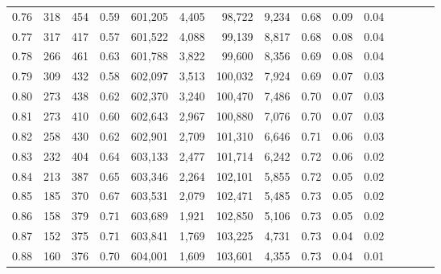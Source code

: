 \begin{tabular}{rrrcrrrrrrrrrrr}
0.76 &     318 &    454 &                                       0.59 &  601,205 &    4,405 &   98,722 &    9,234 &  0.68 &  0.09 &                         0.04 \\
0.77 &     317 &    417 &                                       0.57 &  601,522 &    4,088 &   99,139 &    8,817 &  0.68 &  0.08 &                         0.04 \\
0.78 &     266 &    461 &                                       0.63 &  601,788 &    3,822 &   99,600 &    8,356 &  0.69 &  0.08 &                         0.04 \\
0.79 &     309 &    432 &                                       0.58 &  602,097 &    3,513 &  100,032 &    7,924 &  0.69 &  0.07 &                         0.03 \\
0.80 &     273 &    438 &                                       0.62 &  602,370 &    3,240 &  100,470 &    7,486 &  0.70 &  0.07 &                         0.03 \\
0.81 &     273 &    410 &                                       0.60 &  602,643 &    2,967 &  100,880 &    7,076 &  0.70 &  0.07 &                         0.03 \\
0.82 &     258 &    430 &                                       0.62 &  602,901 &    2,709 &  101,310 &    6,646 &  0.71 &  0.06 &                         0.03 \\
0.83 &     232 &    404 &                                       0.64 &  603,133 &    2,477 &  101,714 &    6,242 &  0.72 &  0.06 &                         0.02 \\
0.84 &     213 &    387 &                                       0.65 &  603,346 &    2,264 &  102,101 &    5,855 &  0.72 &  0.05 &                         0.02 \\
0.85 &     185 &    370 &                                       0.67 &  603,531 &    2,079 &  102,471 &    5,485 &  0.73 &  0.05 &                         0.02 \\
0.86 &     158 &    379 &                                       0.71 &  603,689 &    1,921 &  102,850 &    5,106 &  0.73 &  0.05 &                         0.02 \\
0.87 &     152 &    375 &                                       0.71 &  603,841 &    1,769 &  103,225 &    4,731 &  0.73 &  0.04 &                         0.02 \\
0.88 &     160 &    376 &                                       0.70 &  604,001 &    1,609 &  103,601 &    4,355 &  0.73 &  0.04 &                         0.01 \\

\end{tabular}
